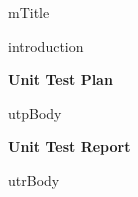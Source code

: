 \documentclass[11pt]{article}
\begin{document}
	
{mTitle}

\setcounter{tocdepth}{3}
\setcounter{secnumdepth}{5}
\tableofcontents
\newpage

{introduction}
\newpage

{\centering \textbf{\LARGE Unit Test Plan} \par}
\vspace{2cm}
{utpBody}
\newpage

{\centering \textbf{\LARGE Unit Test Report} \par}
\vspace{2cm}
{utrBody}
\end{document}
